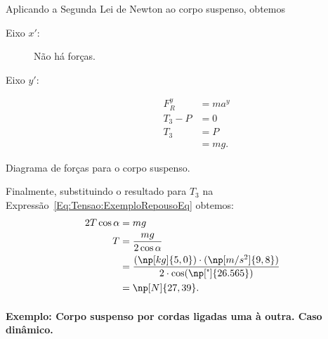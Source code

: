 Aplicando a Segunda Lei de Newton ao corpo suspenso, obtemos
\begin{description}
    \item[Eixo $x'$:] Não há forças.
    \item[Eixo $y'$:]
        \begin{align}
            F_R^y &= m a^y \\
            T_3 - P &= 0 \\
            T_3 &= P \\
            &= mg.
        \end{align}
\end{description}

\begin{marginfigure}[3cm]
\centering
{}
\caption{Diagrama de forças para o corpo suspenso.\label{Fig:Tensao:ExemploRepouso4}}
\end{marginfigure}

Finalmente, substituindo o resultado para $T_3$ na Expressão~\eqref{Eq:Tensao:ExemploRepousoEq} obtemos:
\begin{align}
    2 T\cos\alpha &= mg \\
    T &= \frac{mg}{2\cos\alpha} \\
    &= \frac{(\np[kg]{5,0})\cdot(\np[m/s^2]{9,8})}{2\cdot\cos(\np[\tcdegree]{26.565})} \\
    &= \np[N]{27,39}.
\end{align}

\paragraph{Exemplo: Corpo suspenso por cordas ligadas uma à outra. Caso dinâmico.}

